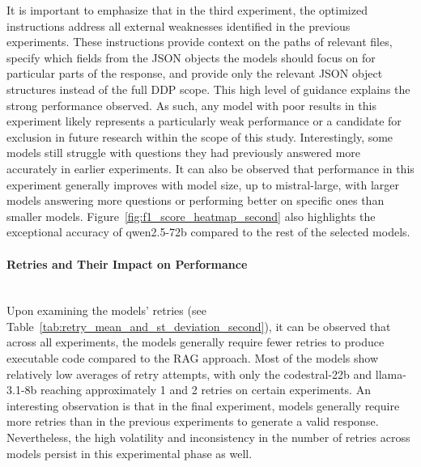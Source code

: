 \documentclass{DESSThesis}
\begin{document}
It is important to emphasize that in the third experiment, the optimized instructions address all external weaknesses identified in the previous experiments. These instructions provide context on the paths of relevant files, specify which fields from the JSON objects the models should focus on for particular parts of the response, and provide only the relevant JSON object structures instead of the full DDP scope. This high level of guidance explains the strong performance observed. As such, any model with poor results in this experiment likely represents a particularly weak performance or a candidate for exclusion in future research within the scope of this study. Interestingly, some models still struggle with questions they had previously answered more accurately in earlier experiments. It can also be observed that performance in this experiment generally improves with model size, up to mistral-large, with larger models answering more questions or performing better on specific ones than smaller models. Figure~\ref{fig:f1_score_heatmap_second} also highlights the exceptional accuracy of qwen2.5-72b compared to the rest of the selected models.

\paragraph{Retries and Their Impact on Performance}\mbox{}\\

\noindent Upon examining the models' retries (see Table~\ref{tab:retry_mean_and_st_deviation_second}), it can be observed that across all experiments, the models generally require fewer retries to produce executable code compared to the RAG approach. Most of the models show relatively low averages of retry attempts, with only the codestral-22b and llama-3.1-8b reaching approximately 1 and 2 retries on certain experiments. An interesting observation is that in the final experiment, models generally require more retries than in the previous experiments to generate a valid response. Nevertheless, the high volatility and inconsistency in the number of retries across models persist in this experimental phase as well.
\end{document}
